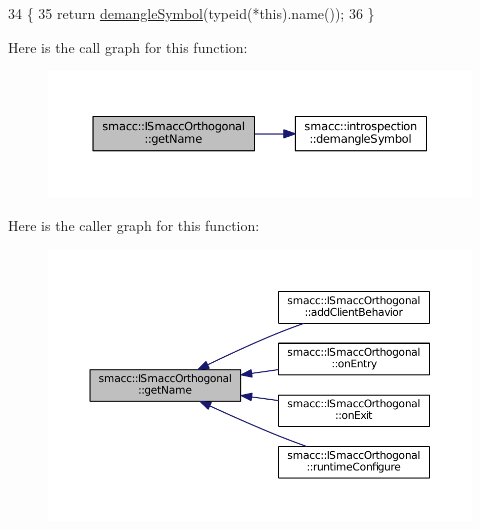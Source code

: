 \begin{DoxyCode}
34 \{
35     \textcolor{keywordflow}{return} \hyperlink{namespacesmacc_1_1introspection_a2f495108db3e57604d8d3ff5ef030302}{demangleSymbol}(\textcolor{keyword}{typeid}(*this).name());
36 \}
\end{DoxyCode}


Here is the call graph for this function\+:
\nopagebreak
\begin{figure}[H]
\begin{center}
\leavevmode
\includegraphics[width=350pt]{classsmacc_1_1ISmaccOrthogonal_a5700505608dcfc30cd613b546076d85f_cgraph}
\end{center}
\end{figure}




Here is the caller graph for this function\+:
\nopagebreak
\begin{figure}[H]
\begin{center}
\leavevmode
\includegraphics[width=350pt]{classsmacc_1_1ISmaccOrthogonal_a5700505608dcfc30cd613b546076d85f_icgraph}
\end{center}
\end{figure}


